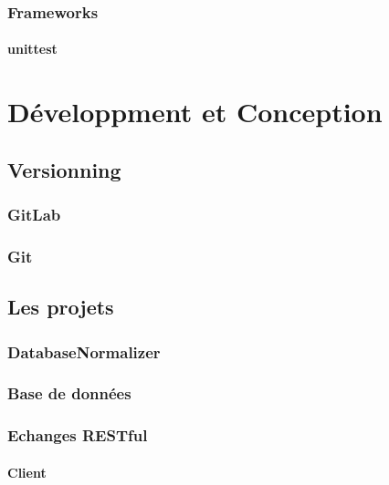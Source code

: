 \documentclass{article}
\begin{document}
    \subsubsection{Frameworks}

    \paragraph{unittest}

    \newpage


    \section{Développment et Conception}

    \subsection{Versionning}

    \subsubsection{GitLab}

    \subsubsection{Git}

    \subsection{Les projets}

    \subsubsection{DatabaseNormalizer}

    \subsubsection{Base de données}

    \subsubsection{Echanges RESTful}

    \paragraph{Client}
\end{document}
